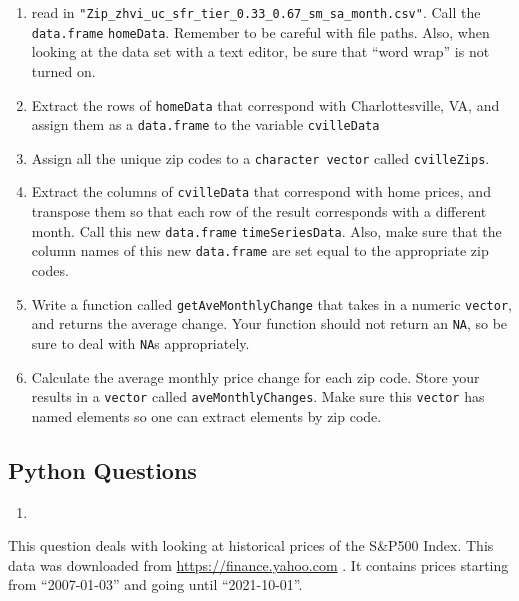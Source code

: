 \documentclass[12pt,krantz2]{krantz}
\providecommand{\tightlist}{%
  \setlength{\itemsep}{0pt}\setlength{\parskip}{0pt}}
\begin{document}
\begin{enumerate}
\def\labelenumi{\alph{enumi})}
\tightlist
\item
  read in \texttt{"Zip\_zhvi\_uc\_sfr\_tier\_0.33\_0.67\_sm\_sa\_month.csv"}. Call the \texttt{data.frame} \texttt{homeData}. Remember to be careful with file paths. Also, when looking at the data set with a text editor, be sure that ``word wrap'' is not turned on.
\item
  Extract the rows of \texttt{homeData} that correspond with Charlottesville, VA, and assign them as a \texttt{data.frame} to the variable \texttt{cvilleData}
\item
  Assign all the unique zip codes to a \texttt{character\ vector} called \texttt{cvilleZips}.
\item
  Extract the columns of \texttt{cvilleData} that correspond with home prices, and transpose them so that each row of the result corresponds with a different month. Call this new \texttt{data.frame} \texttt{timeSeriesData}. Also, make sure that the column names of this new \texttt{data.frame} are set equal to the appropriate zip codes.
\item
  Write a function called \texttt{getAveMonthlyChange} that takes in a numeric \texttt{vector}, and returns the average change. Your function should not return an \texttt{NA}, so be sure to deal with \texttt{NA}s appropriately.
\item
  Calculate the average monthly price change for each zip code. Store your results in a \texttt{vector} called \texttt{aveMonthlyChanges}. Make sure this \texttt{vector} has named elements so one can extract elements by zip code.
\end{enumerate}

\hypertarget{python-questions-6}{%
\subsection{Python Questions}\label{python-questions-6}}

\begin{enumerate}
\def\labelenumi{\arabic{enumi}.}
\item
\end{enumerate}

This question deals with looking at historical prices of the S\&P500 Index. This data was downloaded from \url{https://finance.yahoo.com} \citep{gspc_data}. It contains prices starting from ``2007-01-03'' and going until ``2021-10-01''.
\end{document}
